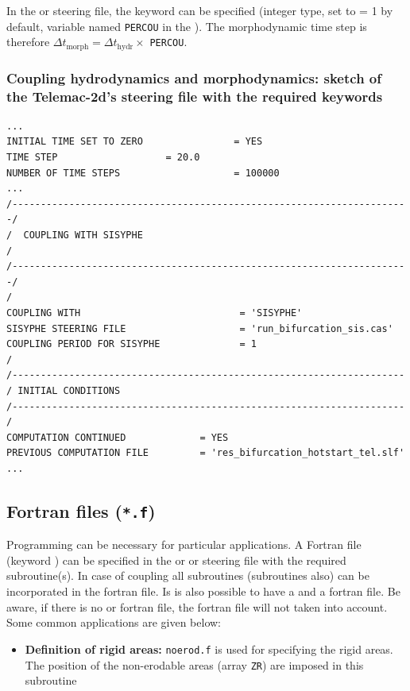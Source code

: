 {In the  or  steering file, the keyword  can be specified (integer type, set to {\ttfamily = 1} by default, variable named \texttt{PERCOU} in the \telemacsystem{}). The morphodynamic time step is therefore $\Delta t_{\text{morph}} = \Delta t_{\text{hydr}} \times$ \texttt{PERCOU}.

\pagebreak

\subsubsection{Coupling hydrodynamics and morphodynamics: sketch of the Telemac-2d's steering file with the required keywords}
\lstset{language=TelemacCas,
        basicstyle=\scriptsize\ttfamily}
\begin{lstlisting}[frame=trBL]
...
INITIAL TIME SET TO ZERO                = YES
TIME STEP			        = 20.0
NUMBER OF TIME STEPS                    = 100000
...
/----------------------------------------------------------------------/
/  COUPLING WITH SISYPHE                                               /
/----------------------------------------------------------------------/
/
COUPLING WITH                            = 'SISYPHE'
SISYPHE STEERING FILE                    = 'run_bifurcation_sis.cas'
COUPLING PERIOD FOR SISYPHE              = 1
/
/---------------------------------------------------------------------
/ INITIAL CONDITIONS
/---------------------------------------------------------------------
/
COMPUTATION CONTINUED             = YES
PREVIOUS COMPUTATION FILE         = 'res_bifurcation_hotstart_tel.slf'
...
\end{lstlisting}
\subsection{Fortran files (\texttt{*.f})}
Programming can be necessary for particular applications. A Fortran file (keyword ) can be specified in the  or  or \sisyphe steering file with the required subroutine(s). In case of coupling all subroutines (\sisyphe subroutines also) can be incorporated in the \telemac fortran file. Is is also possible to have a \telemac and a \sisyphe fortran file. Be aware, if there is no  or  fortran file, the \sisyphe fortran file will not taken into account.
Some common applications are given below:
\begin{itemize}
\item \textbf{Definition of rigid areas:} \texttt{noerod.f} is used for specifying the rigid areas. The position of the non-erodable areas (array \texttt{ZR}) are imposed in this subroutine 


\end{itemize}}
